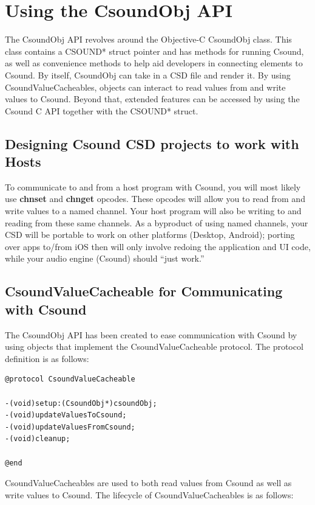 \documentclass[11pt]{article}
\begin{document}
\section{Using the CsoundObj API}

The CsoundObj API revolves around the Objective-C CsoundObj class. This class contains a CSOUND* struct pointer and has methods for running Csound, as well as convenience methods to help aid developers in connecting elements to Csound. By itself, CsoundObj can take in a CSD file and render it.  By using CsoundValueCacheables, objects can interact to read values from and write values to Csound.  Beyond that, extended features can be accessed by using the Csound C API together with the CSOUND* struct.

\subsection{Designing Csound CSD projects to work with Hosts}

To communicate to and from a host program with Csound, you will most likely use \textbf{chnset} and \textbf{chnget} opcodes. These opcodes will allow you to read from and write values to a named channel.  Your host program will also be writing to and reading from these same channels.  As a byproduct of using named channels, your CSD will be portable to work on other platforms (Desktop, Android); porting over apps to/from iOS then will only involve redoing the application and UI code, while your audio engine (Csound) should ``just work.'' 

 

\subsection{CsoundValueCacheable for Communicating with Csound}

The CsoundObj API has been created to ease communication with Csound by using objects that implement the CsoundValueCacheable protocol.  The protocol definition is as follows:

\begin{lstlisting}[caption=CsoundValueCacheable Protocol Definition]
@protocol CsoundValueCacheable

-(void)setup:(CsoundObj*)csoundObj;
-(void)updateValuesToCsound;
-(void)updateValuesFromCsound;
-(void)cleanup;

@end
\end{lstlisting}

CsoundValueCacheables are used to both read values from Csound as well as write values to Csound.  The lifecycle of CsoundValueCacheables is as follows:
\end{document}
